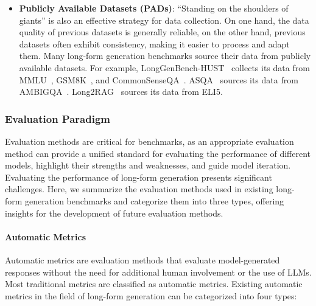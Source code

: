 \documentclass[11pt, a4paper, logo, copyright, nonumbering]{map}
\begin{document}
\begin{itemize}
    \item \textbf{Publicly Available Datasets (PADs)}: ``Standing on the shoulders of giants'' is also an effective strategy for data collection. On one hand, the data quality of previous datasets is generally reliable, on the other hand, previous datasets often exhibit consistency, making it easier to process and adapt them. Many long-form generation benchmarks source their data from publicly available datasets. For example, LongGenBench-HUST~\citep{liu2024longgenbench} collects its data from MMLU~\citep{hendrycks2020measuring}, GSM8K~\citep{cobbe2021training}, and CommonSenseQA~\citep{talmor2018commonsenseqa}. ASQA~\citep{stelmakh2022asqa} sources its data from AMBIGQA~\citep{min2020ambigqa}. Long2RAG~\citep{qi2024long2rag} sources its data from ELI5.
\end{itemize}

\subsubsection{Evaluation Paradigm}
\label{sec:long-form-evaluation-methods}

Evaluation methods are critical for benchmarks, as an appropriate evaluation method can provide a unified standard for evaluating the performance of different models, highlight their strengths and weaknesses, and guide model iteration. Evaluating the performance of long-form generation presents significant challenges. Here, we summarize the evaluation methods used in existing long-form generation benchmarks and categorize them into three types, offering insights for the development of future evaluation methods.
\paragraph{Automatic Metrics}

Automatic metrics are evaluation methods that evaluate model-generated responses without the need for additional human involvement or the use of LLMs. Most traditional metrics are classified as automatic metrics. 
Existing automatic metrics in the field of long-form generation can be categorized into four types:
\end{document}
